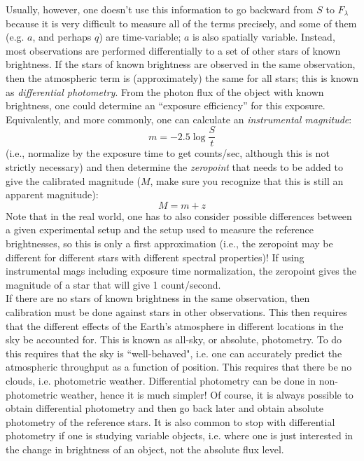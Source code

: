 \documentclass[12pt]{article}
\begin{document}
\noindent Usually, however, one doesn't use this information to go
backward from $S$ to $F_{\lambda}$ because it is very
difficult to measure all of the terms precisely, and some of them
(e.g. $a$, and perhaps $q$) are time-variable; $a$ is also spatially
variable. Instead, most observations are performed differentially to a
set of other stars of known brightness. If the stars of known
brightness are observed in the same observation, then the atmospheric
term is (approximately) the same for all stars; this is known as
\emph{differential photometry}. From the photon flux of the object with known
brightness, one could determine an ``exposure efficiency'' for this
exposure. Equivalently, and more commonly, one can calculate an
\emph{instrumental magnitude}:
\begin{equation*}
    m = -2.5 \log \frac{S}{t}
\end{equation*}
(i.e., normalize by the exposure time to get counts/sec, although this
is not strictly necessary) and then determine the \emph{zeropoint} that needs
to be added to give the calibrated magnitude ($M$, make sure you
recognize that this is still an apparent magnitude):
\begin{equation*}
    M = m + z
\end{equation*}
Note that in the real world, one has to also consider possible
differences between a given experimental setup and the setup used to
measure the reference brightnesses, so this is only a first
approximation (i.e., the zeropoint may be different for different
stars with different spectral properties)! If using instrumental mags
including exposure time normalization, the zeropoint gives the
magnitude of a star that will give 1 count/second.\\

\noindent If there are no stars of known brightness in the same
observation, then calibration must be done against stars in other
observations. This then requires that the different effects of the
Earth's atmosphere in different locations in the sky be accounted for.
This is known as all-sky, or absolute, photometry. To do this requires
that the sky is ``well-behaved", i.e. one can accurately predict the
atmospheric throughput as a function of position. This requires that
there be no clouds, i.e. photometric weather. Differential photometry
can be done in non-photometric weather, hence it is much simpler! Of
course, it is always possible to obtain differential photometry and
then go back later and obtain absolute photometry of the reference
stars. It is also common to stop with differential photometry if one
is studying variable objects, i.e. where one is just interested in the
change in brightness of an object, not the absolute flux level.\\
\end{document}
